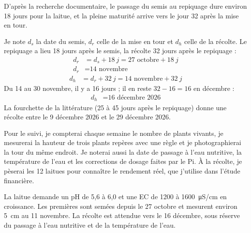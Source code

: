 D'après la recherche documentaire, le passage du semis au repiquage dure environ 18 jours pour la laitue, et la pleine maturité arrive vers le jour 32 après la mise en tour.

\begin{demonstration}
Je note $d_s$ la date du semis, $d_r$ celle de la mise en tour et $d_h$ celle de la récolte. Le repiquage a lieu 18 jours après le semis, la récolte 32 jours après le repiquage :
\begin{align*}
d_r &= d_s + \qty{18}{j} = \text{27 octobre} + \qty{18}{j}\\
d_r &= \text{14 novembre}
\end{align*}
\begin{align*}
d_h &= d_r + \qty{32}{j} = \text{14 novembre} + \qty{32}{j}
\end{align*}
Du 14 au 30 novembre, il y a 16 jours ; il en reste $32 - 16 = 16$ en décembre :
\begin{align*}
d_h &= \text{16 décembre 2026}
\end{align*}
La fourchette de la littérature (25 à 45 jours après le repiquage) donne une récolte entre le 9 décembre 2026 et le 29 décembre 2026.
\end{demonstration}

Pour le suivi, je compterai chaque semaine le nombre de plants vivants, je mesurerai la hauteur de trois plants repères avec une règle et je photographierai la tour du même endroit. Je noterai aussi la date de passage à l'eau nutritive, la température de l'eau et les corrections de dosage faites par le Pi. À la récolte, je pèserai les 12 laitues pour connaître le rendement réel, que j'utilise dans l'étude financière.

\begin{aretenir}
La laitue demande un pH de 5,6 à 6,0 et une EC de 1200 à \qty{1600}{\micro S/cm} en croissance. Les premières sont semées depuis le 27 octobre et mesurent environ \qty{5}{cm} au 11 novembre. La récolte est attendue vers le 16 décembre, sous réserve du passage à l'eau nutritive et de la température de l'eau.
\end{aretenir}

